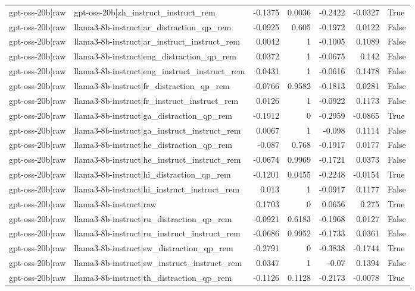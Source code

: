\begin{table}
\begin{tabular}{l l r r r r l}
gpt-oss-20b|raw & gpt-oss-20b|zh_instruct_instruct_rem & -0.1375 & 0.0036 & -0.2422 & -0.0327 & True \\
gpt-oss-20b|raw & llama3-8b-instruct|ar_distraction_qp_rem & -0.0925 & 0.605 & -0.1972 & 0.0122 & False \\
gpt-oss-20b|raw & llama3-8b-instruct|ar_instruct_instruct_rem & 0.0042 & 1 & -0.1005 & 0.1089 & False \\
gpt-oss-20b|raw & llama3-8b-instruct|eng_distraction_qp_rem & 0.0372 & 1 & -0.0675 & 0.142 & False \\
gpt-oss-20b|raw & llama3-8b-instruct|eng_instruct_instruct_rem & 0.0431 & 1 & -0.0616 & 0.1478 & False \\
gpt-oss-20b|raw & llama3-8b-instruct|fr_distraction_qp_rem & -0.0766 & 0.9582 & -0.1813 & 0.0281 & False \\
gpt-oss-20b|raw & llama3-8b-instruct|fr_instruct_instruct_rem & 0.0126 & 1 & -0.0922 & 0.1173 & False \\
gpt-oss-20b|raw & llama3-8b-instruct|ga_distraction_qp_rem & -0.1912 & 0 & -0.2959 & -0.0865 & True \\
gpt-oss-20b|raw & llama3-8b-instruct|ga_instruct_instruct_rem & 0.0067 & 1 & -0.098 & 0.1114 & False \\
gpt-oss-20b|raw & llama3-8b-instruct|he_distraction_qp_rem & -0.087 & 0.768 & -0.1917 & 0.0177 & False \\
gpt-oss-20b|raw & llama3-8b-instruct|he_instruct_instruct_rem & -0.0674 & 0.9969 & -0.1721 & 0.0373 & False \\
gpt-oss-20b|raw & llama3-8b-instruct|hi_distraction_qp_rem & -0.1201 & 0.0455 & -0.2248 & -0.0154 & True \\
gpt-oss-20b|raw & llama3-8b-instruct|hi_instruct_instruct_rem & 0.013 & 1 & -0.0917 & 0.1177 & False \\
gpt-oss-20b|raw & llama3-8b-instruct|raw & 0.1703 & 0 & 0.0656 & 0.275 & True \\
gpt-oss-20b|raw & llama3-8b-instruct|ru_distraction_qp_rem & -0.0921 & 0.6183 & -0.1968 & 0.0127 & False \\
gpt-oss-20b|raw & llama3-8b-instruct|ru_instruct_instruct_rem & -0.0686 & 0.9952 & -0.1733 & 0.0361 & False \\
gpt-oss-20b|raw & llama3-8b-instruct|sw_distraction_qp_rem & -0.2791 & 0 & -0.3838 & -0.1744 & True \\
gpt-oss-20b|raw & llama3-8b-instruct|sw_instruct_instruct_rem & 0.0347 & 1 & -0.07 & 0.1394 & False \\
gpt-oss-20b|raw & llama3-8b-instruct|th_distraction_qp_rem & -0.1126 & 0.1128 & -0.2173 & -0.0078 & True \\

\end{tabular}
\end{table}
